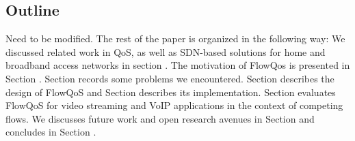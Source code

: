 \subsection{Outline}
{\color{red} Need to be modified.} The rest of the paper is organized in the following way: We discussed related work in QoS, as well as SDN-based solutions for home and broadband access networks in section . The motivation of FlowQos is presented in Section . Section  records some problems we encountered. Section  describes the design of FlowQoS and Section  describes its implementation. Section  evaluates FlowQoS for video streaming and VoIP applications in the context of competing flows. We discusses future work and open research avenues in Section  and concludes in Section .

